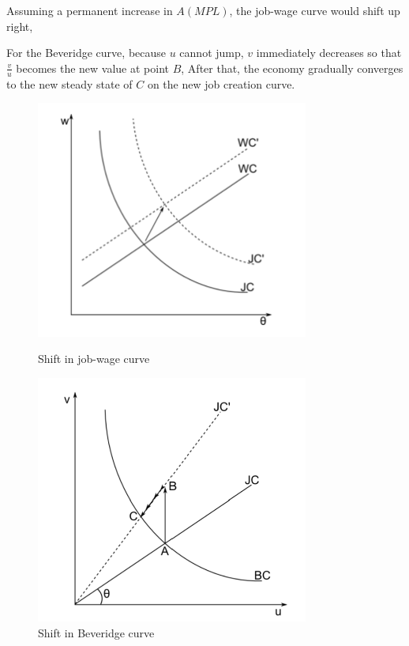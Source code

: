 Assuming a permanent increase in $A(MPL)$, the job-wage curve would shift up right,

For the Beveridge curve, because $u$ cannot
jump, $v$ immediately decreases so that $\frac{v}{u}$ becomes the new value at point $B$,
After that, the economy gradually converges to the new steady state of $C$ on the new job creation curve.
\begin{figure}[!htbp]
    \centering
    \begin{minipage}[b]{0.45\textwidth}
        \includegraphics[width=0.8\textwidth]{figures/newjobwage.png}
        \caption{Shift in job-wage curve}
    \end{minipage}
    \begin{minipage}[b]{0.45\textwidth}
        \includegraphics[width=0.8\textwidth]{figures/BCshift.png}
        \caption{Shift in Beveridge curve} 
    \end{minipage}
\end{figure}

